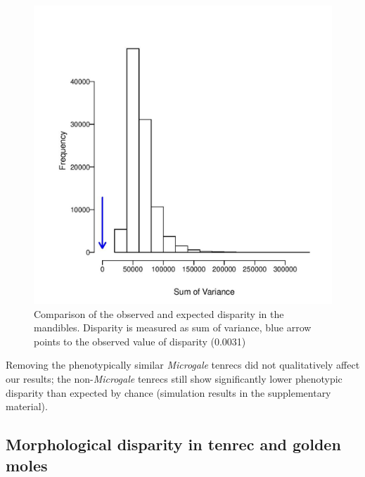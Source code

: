 \documentclass[12pt,a4paper]{article}
\begin{document}
\begin{figure}
\centering
\includegraphics[width=1\linewidth]{figures/mands_trc+gmole_tenrec_sumvariance.jpg}

\caption{Comparison of the observed and expected disparity in the mandibles. Disparity is measured as sum of variance, blue arrow points to the observed value of disparity (0.0031)}
\label{fig:mands_sumvar}
\end{figure}




Removing the phenotypically similar \textit{Microgale} tenrecs did not qualitatively affect our results; the non-\textit{Microgale} tenrecs still show significantly lower phenotypic disparity than expected by chance (simulation results in the supplementary material). 



\subsection{Morphological disparity in tenrec and golden moles} 
 
\end{document}
